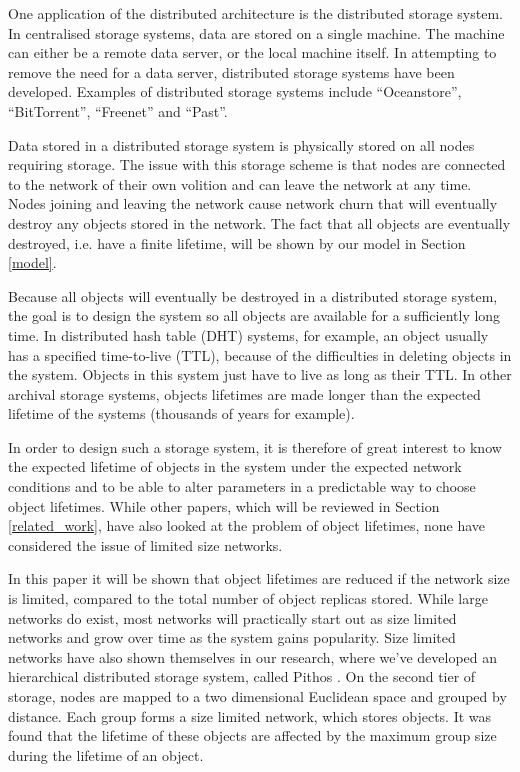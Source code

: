 \documentclass[10pt,a4paper,conference]{IEEEtran}
\begin{document}
One application of the distributed architecture is the distributed storage system. In centralised storage systems, data are stored on a single machine. The machine can either be a remote data server, or the local machine itself. In attempting to remove the need for a data server, distributed storage systems have been developed. Examples of distributed storage systems include ``Oceanstore'', ``BitTorrent'', ``Freenet'' and ``Past''.

Data stored in a distributed storage system is physically stored on all nodes requiring storage. The issue with this storage scheme is that nodes are connected to the network of their own volition and can leave the network at any time. Nodes joining and leaving the network cause network churn that will eventually destroy any objects stored in the network. The fact that all objects are eventually destroyed, i.e. have a finite lifetime, will be shown by our model in Section \ref{model}.

Because all objects will eventually be destroyed in a distributed storage system, the goal is to design the system so all objects are available for a sufficiently long time. In distributed hash table (DHT) systems, for example, an object usually has a specified time-to-live (TTL), because of the difficulties in deleting objects in the system. Objects in this system just have to live as long as their TTL. In other archival storage systems, objects lifetimes are made longer than the expected lifetime of the systems (thousands of years for example).

In order to design such a storage system, it is therefore of great interest to know the expected lifetime of objects in the system under the expected network conditions and to be able to alter parameters in a predictable way to choose object lifetimes. While other papers, which will be reviewed in Section \ref{related_work}, have also looked at the problem of object lifetimes, none have considered the issue of limited size networks.

In this paper it will be shown that object lifetimes are reduced if the network size is limited, compared to the total number of object replicas stored. While large networks do exist, most networks will practically start out as size limited networks and grow over time as the system gains popularity. Size limited networks have also shown themselves in our research, where we've developed an hierarchical distributed storage system, called Pithos \cite{Pithos_mmve_2011}. On the second tier of storage, nodes are mapped to a two dimensional Euclidean space and grouped by distance. Each group forms a size limited network, which stores objects. It was found that the lifetime of these objects are affected by the maximum group size during the lifetime of an object.
\end{document}
